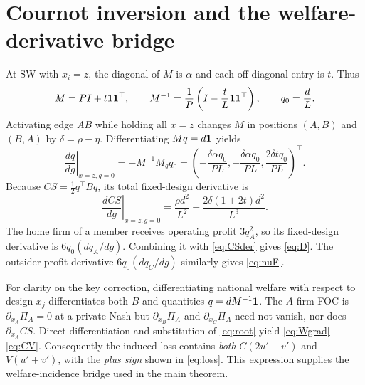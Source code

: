 \documentclass[11pt,a4paper]{article}
\theoremstyle{remark}\newtheorem{remark}[theorem]{Remark}
\newcommand{\SW}{\mathrm{SW}}\newcommand{\SU}{\mathrm{SU}}\newcommand{\IS}{\mathrm{IS}}
\begin{document}
\section{Cournot inversion and the welfare-derivative bridge}\label{app:bridge}
At $\SW$ with $x_i=z$, the diagonal of $M$ is $\alpha$ and each off-diagonal entry is $t$. Thus
\begin{equation}\label{eq:inv}
M=P I+t\boldsymbol{1}\boldsymbol{1}^{\top},\qquad
M^{-1}=\frac1P\left(I-\frac{t}{L}\boldsymbol{1}\boldsymbol{1}^{\top}\right),\qquad q_0=\frac dL.
\end{equation}
Activating edge $AB$ while holding all $x=z$ changes $M$ in positions $(A,B)$ and $(B,A)$ by $\delta=\rho-\eta$. Differentiating $Mq=d\boldsymbol{1}$ yields
\begin{equation}\label{eq:quantityDer}
\left.\frac{dq}{dg}\right|_{x=z,g=0}=-M^{-1}M_gq_0
=\left(-\frac{\delta\alpha q_0}{PL},-\frac{\delta\alpha q_0}{PL},\frac{2\delta t q_0}{PL}\right)^\top.
\end{equation}
Because $CS=\tfrac12q^\top Bq$, its total fixed-design derivative is
\begin{equation}\label{eq:CSder}
\left.\frac{dCS}{dg}\right|_{x=z,g=0}
=\frac{\rho d^2}{L^2}-\frac{2\delta(1+2t)d^2}{L^3}.
\end{equation}
The home firm of a member receives operating profit $3q_A^2$, so its fixed-design derivative is $6q_0(dq_A/dg)$. Combining it with \eqref{eq:CSder} gives \eqref{eq:D}. The outsider profit derivative $6q_0(dq_C/dg)$ similarly gives \eqref{eq:nuF}.

For clarity on the key correction, differentiating national welfare with respect to design $x_j$ differentiates both $B$ and quantities $q=dM^{-1}\boldsymbol{1}$. The $A$-firm FOC is $\partial_{x_A}\Pi_A=0$ at a private Nash but $\partial_{x_B}\Pi_A$ and $\partial_{x_C}\Pi_A$ need not vanish, nor does $\partial_{x_A}CS$. Direct differentiation and substitution of \eqref{eq:root} yield \eqref{eq:Wgrad}--\eqref{eq:CV}. Consequently the induced loss contains \emph{both} $C(2u'+v')$ and $V(u'+v')$, with the \emph{plus sign} shown in \eqref{eq:loss}. This expression supplies the welfare-incidence bridge used in the main theorem.
\end{document}

